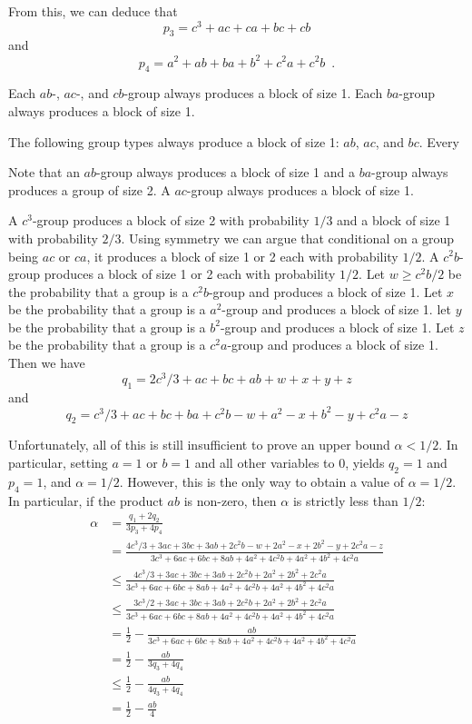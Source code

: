\documentclass{patmorin}
\begin{document}
From this, we can deduce that
\[
    p_3 = c^3 + ac + ca + bc + cb
\]
and
\[
    p_4 = a^2 + ab + ba + b^2 + c^2a + c^2b \enspace .
\]

Each $ab$-, $ac$-, and $cb$-group always produces a block of size 1.
Each $ba$-group always produces a block of size 1.




The following group types always produce a block of size 1: $ab$, $ac$,
and $bc$.  Every


Note that an $ab$-group always produces a block of size 1 and a $ba$-group
always produces a group of size 2.  
A $ac$-group always produces a block of size 1.


A $c^3$-group produces a block of size
2 with probability $1/3$ and a block of size 1 with probability $2/3$.
Using symmetry we can argue that conditional on a group being $ac$ or $ca$, it produces a block of size 1 or 2 each with probability $1/2$.
A $c^2b$-group produces a block of size 1 or 2 each with probability $1/2$.
Let $w\ge c^2b/2$ be the probability that a group is a $c^2b$-group and produces a block of size 1.
Let $x$ be the probability that a group is a $a^2$-group and produces a block of size 1.
let $y$ be the probability that a group is a $b^2$-group and produces a block of size 1.
Let $z$ be the probability that a group is a $c^2a$-group and produces a block of size 1.
Then we have
\[
    q_1 = 2c^3/3 + ac + bc + ab + w + x + y + z
\]
and 
\[
    q_2 = c^3/3 + ac + bc + ba + c^2b - w + a^2 - x + b^2 -y+ c^2a-z
\]

Unfortunately, all of this is still insufficient to prove an upper
bound $\alpha < 1/2$. In particular, setting $a=1$ or $b=1$ and all
other variables to 0, yields $q_2=1$ and $p_4 = 1$, and $\alpha=1/2$.
However, this is the only way to obtain a
value of $\alpha = 1/2$.  
In particular, if the product $ab$ is non-zero,
then $\alpha$ is strictly less than $1/2$:
\begin{align*}
  \alpha & = \frac{q_1+2q_2}{3p_3 + 4p_4} \\
     & = \frac
        {4c^3/3 + 3ac + 3bc + 3ab + 2c^2b -w + 2a^2 - x + 2b^2 - y + 2c^2a -z}
        {3c^3 + 6ac + 6bc + 8ab + 4a^2 + 4c^2b + 4a^2 + 4b^2 + 4c^2a} \\
     & \le \frac
        {4c^3/3 + 3ac + 3bc + 3ab + 2c^2b + 2a^2 + 2b^2  + 2c^2a}
        {3c^3 + 6ac + 6bc + 8ab + 4a^2 + 4c^2b + 4a^2 + 4b^2 + 4c^2a} \\
     & \le \frac
        {3c^3/2 + 3ac + 3bc + 3ab + 2c^2b + 2a^2 + 2b^2  + 2c^2a}
        {3c^3 + 6ac + 6bc + 8ab + 4a^2 + 4c^2b + 4a^2 + 4b^2 + 4c^2a} \\
     & = \frac{1}{2}- 
        \frac{ab}
        {3c^3 + 6ac + 6bc + 8ab + 4a^2 + 4c^2b + 4a^2 + 4b^2 + 4c^2a} \\
     & = \frac{1}{2}- 
        \frac{ab}{3q_3 + 4q_4} \\
     & \le \frac{1}{2}- 
        \frac{ab}{4q_3 + 4q_4} \\
     & = \frac{1}{2}- 
        \frac{ab}{4}
\end{align*}
\end{document}
